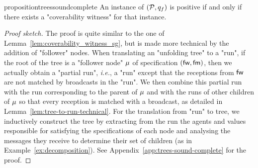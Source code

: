 \begin{restatable}{proposition}{treessoundcomplete}
	\label{prop:trees-sound-complete}
	An instance of \COVER $(\mathcal{P},q_f)$ is positive if and only if there exists a "coverability witness" for that instance.
\end{restatable}
\begin{proof}[Proof sketch]
	The proof is quite similar to the one of Lemma~\ref{lem:coverability_witness_sg}, but is made more technical by the addition of "follower" nodes. 
	When translating an "unfolding tree" to a "run", if the root of the tree is a "follower node" $\mu$ of specification $(\mathsf{fw}, \mathsf{fm})$, then we actually obtain a "partial run", \emph{i.e.}, a "run" except that the receptions from $\mathsf{fw}$ are not matched by broadcasts in the "run". We then combine this partial run with the run corresponding to the parent of $\mu$ and with the runs of other children of $\mu$ so that every reception is matched with a broadcast, as detailed in Lemma~\ref{lem:tree-to-run-technical}.
	For the translation from "run" to tree, we inductively construct the tree by extracting from the run the agents and values responsible for satisfying the specifications of each node and analysing the messages they receive to determine their set of children (as in Example~\ref{ex:decomposition}). See Appendix~\ref{app:trees-sound-complete} for the proof.
\end{proof}





